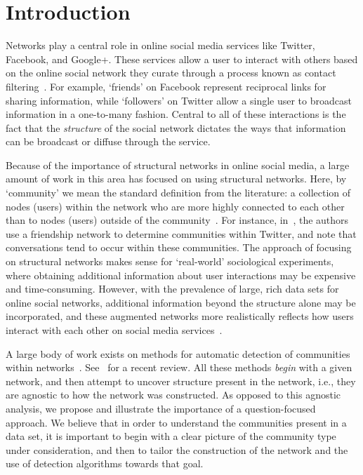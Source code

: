 \section{Introduction}

Networks play a central role in online social media services like Twitter, Facebook, and Google+. These services allow a user to interact with others based on the online social network they curate through a process known as contact filtering~\cite{cazabet2012automated}. For example, `friends' on Facebook represent reciprocal links for sharing information, while `followers' on Twitter allow a single user to broadcast information in a one-to-many fashion. Central to all of these interactions is the fact that the \emph{structure} of the social network dictates the ways that information can be broadcast or diffuse through the service.

Because of the importance of structural networks in online social media, a large amount of work in this area has focused on using structural networks. Here, by `community' we mean the standard definition from the literature: a collection of nodes (users) within the network who are more highly connected to each other than to nodes (users) outside of the community~\cite{newman2004finding}. For instance, in~\cite{java2009we}, the authors use a friendship network to determine communities within Twitter, and note that conversations tend to occur within these communities. The approach of focusing on structural networks makes sense for `real-world' sociological experiments, where obtaining additional information about user interactions may be expensive and time-consuming. However, with the prevalence of large, rich data sets for online social networks, additional information beyond the structure alone may be incorporated, and these augmented networks more realistically reflects how users interact with each other on social media services~\cite{grabowicz2012social}.

A large body of work exists on methods for automatic detection of communities within networks~\cite{newman2004fast,newman2004finding,rosvall2008maps,blondel2008fast,LancichinettiPlos}. See~\cite{fortunato2010community} for a recent review. All these methods \emph{begin} with a given network, and then attempt to uncover structure present in the network, i.e., they are agnostic to how the network was constructed. As opposed to this agnostic analysis, we propose and illustrate the importance of a question-focused approach. We believe that in order to understand the communities present in a data set, it is important to begin with a clear picture of the community type under consideration, and then to tailor the construction of the network and the use of detection algorithms towards that goal.

